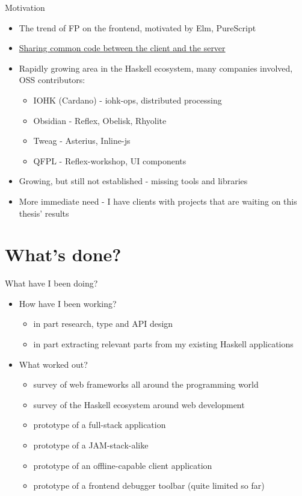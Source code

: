 \documentclass[presentation]{beamer}
\begin{document}
\begin{frame}[label={sec:orgf447b17}]{Motivation}
\begin{itemize}
\item The trend of FP on the frontend, motivated by Elm, PureScript
\item \uline{Sharing common code between the client and the server}
\item Rapidly growing area in the Haskell ecosystem, many companies involved, OSS
contributors:
\begin{itemize}
\item IOHK (Cardano) - iohk-ops, distributed processing
\item Obsidian - Reflex, Obelisk, Rhyolite
\item Tweag - Asterius, Inline-js
\item QFPL - Reflex-workshop, UI components
\end{itemize}
\item Growing, but still not established - missing tools and libraries
\item More immediate need - I have clients with projects that are waiting on this
thesis' results
\end{itemize}
\end{frame}

\section{What's done?}
\label{sec:orgeede75e}
\begin{frame}[label={sec:orgdf131b5}]{What have I been doing?}
\begin{itemize}
\item How have I been working?
\begin{itemize}
\item in part research, type and API design
\item in part extracting relevant parts from my existing Haskell applications
\end{itemize}
\end{itemize}

\pause

\begin{itemize}
\item What worked out?
\begin{itemize}
\item survey of web frameworks all around the programming world
\item survey of the Haskell ecosystem around web development
\item prototype of a full-stack application
\item prototype of a JAM-stack-alike
\item prototype of an offline-capable client application
\item prototype of a frontend debugger toolbar (quite limited so far)
\end{itemize}
\end{itemize}
\end{frame}
\end{document}
